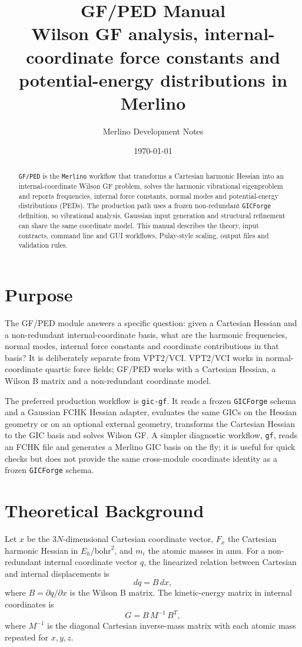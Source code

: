 \documentclass[11pt]{article}
\title{\textbf{GF/PED Manual}\\
\large Wilson GF analysis, internal-coordinate force constants and potential-energy distributions in Merlino}
\author{Merlino Development Notes}
\date{\today}
\newcommand{\program}{\texttt{GF/PED}}
\newcommand{\merlino}{\texttt{Merlino}}
\newcommand{\gicforge}{\texttt{GICForge}}
\newcommand{\bohr}{\text{bohr}}
\begin{document}
\maketitle

\begin{abstract}
\program{} is the \merlino{} workflow that transforms a Cartesian harmonic
Hessian into an internal-coordinate Wilson GF problem, solves the harmonic
vibrational eigenproblem and reports frequencies, internal force constants,
normal modes and potential-energy distributions (PEDs).  The production path
uses a frozen non-redundant \gicforge{} definition, so vibrational analysis,
Gaussian input generation and structural refinement can share the same
coordinate model.  This manual describes the theory, input contracts, command
line and GUI workflows, Pulay-style scaling, output files and validation rules.
\end{abstract}

\tableofcontents
\newpage

\section{Purpose}

The GF/PED module answers a specific question: given a Cartesian Hessian and a
non-redundant internal-coordinate basis, what are the harmonic frequencies,
normal modes, internal force constants and coordinate contributions in that
basis?  It is deliberately separate from VPT2/VCI.  VPT2/VCI works in
normal-coordinate quartic force fields; GF/PED works with a Cartesian Hessian,
a Wilson B matrix and a non-redundant coordinate model.

The preferred production workflow is \texttt{gic-gf}.  It reads a frozen
\gicforge{} schema and a Gaussian FCHK Hessian adapter, evaluates the same GICs
on the Hessian geometry or on an optional external geometry, transforms the
Cartesian Hessian to the GIC basis and solves Wilson GF.  A simpler diagnostic
workflow, \texttt{gf}, reads an FCHK file and generates a Merlino GIC basis on
the fly; it is useful for quick checks but does not provide the same
cross-module coordinate identity as a frozen \gicforge{} schema.

\section{Theoretical Background}

Let \(x\) be the \(3N\)-dimensional Cartesian coordinate vector, \(F_x\) the
Cartesian harmonic Hessian in \(E_h/\bohr^2\), and \(m_i\) the atomic masses in
amu.  For a non-redundant internal coordinate vector \(q\), the linearized
relation between Cartesian and internal displacements is
\[
  dq = B\,dx ,
\]
where \(B=\partial q/\partial x\) is the Wilson B matrix.  The kinetic-energy
matrix in internal coordinates is
\[
  G = B\,M^{-1}\,B^T ,
\]
where \(M^{-1}\) is the diagonal Cartesian inverse-mass matrix with each atomic
mass repeated for \(x,y,z\).
\end{document}
